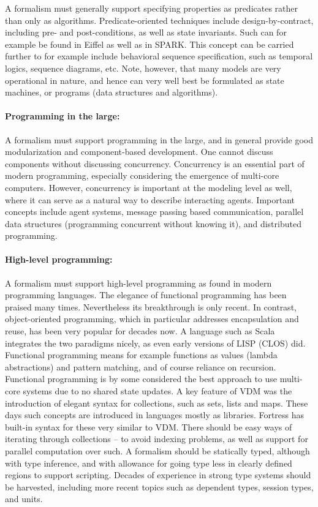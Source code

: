 A formalism must generally support specifying properties as 
predicates rather than only as algorithms. Predicate-oriented techniques 
include design-by-contract, including pre- and post-conditions, as 
well as state invariants. Such can for example be found in Eiffel 
as  well as in SPARK. This concept can be carried 
further to for example include behavioral sequence specification, 
such as temporal logics, sequence diagrams, etc.
Note, however, that many models are very operational in
nature, and hence can very well best be formulated as state 
machines, or programs (data structures and algorithms). 

\paragraph{Programming in the large:}

A formalism must support programming in the large, and in general
provide good modularization and component-based development. One cannot discuss components without discussing concurrency. Concurrency is an essential part of modern programming, especially 
considering the emergence of multi-core computers. However, 
concurrency is important at the modeling level as well, where it 
can serve as a natural way to describe interacting agents. 
Important concepts include agent systems, message passing based 
communication, parallel data structures (programming concurrent 
without knowing it), and distributed programming.

\paragraph{High-level programming:}

A formalism must support high-level programming as found in modern
programming languages. The elegance  of functional programming has 
been praised many times. Nevertheless its breakthrough is only 
recent. In contrast, object-oriented programming, 
which in particular addresses encapsulation and reuse, has been very 
popular for decades now. A language such as Scala 
integrates the two paradigms nicely, as even early versions 
of LISP (CLOS) did. 
Functional programming means for example functions as 
values (lambda abstractions) and pattern matching, and of course 
reliance on recursion. Functional programming is by some considered 
the best approach to use multi-core systems due to no shared state 
updates. A key feature of VDM was the introduction of elegant syntax for collections, such as sets, lists and maps. These days such concepts are introduced in languages mostly as libraries. Fortress has built-in syntax for these very similar to VDM.
There should be easy ways of iterating through collections – to avoid indexing problems, as well as support for parallel computation over such.
A formalism should be statically typed, although with type inference, and with allowance for going type less
in clearly defined regions to support scripting. 
Decades of experience in strong type systems should be harvested, including more recent  topics such as dependent types, session types, and units.

